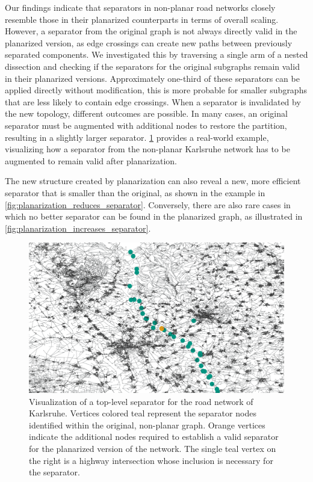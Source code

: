 Our findings indicate that separators in non-planar road networks closely resemble those in their planarized counterparts in terms of overall scaling.
However, a separator from the original graph is not always directly valid in the planarized version, as edge crossings can create new paths between previously separated components.
We investigated this by traversing a single arm of a nested dissection and checking if the separators for the original subgraphs remain valid in their planarized versions.
Approximately one-third of these separators can be applied directly without modification, this is more probable for smaller subgraphs that are less likely to contain edge crossings.
When a separator is invalidated by the new topology, different outcomes are possible.
In many cases, an original separator must be augmented with additional nodes to restore the partition, resulting in a slightly larger separator.
\cref{fig:karlsruhe_planar_vs_non_planar} provides a real-world example, visualizing how a separator from the non-planar Karlsruhe network has to be augmented to remain valid after planarization.

The new structure created by planarization can also reveal a new, more efficient separator that is smaller than the original, as shown in the example in \cref{fig:planarization_reduces_separator}.
Conversely, there are also rare cases in which no better separator can be found in the planarized graph, as illustrated in \cref{fig:planarization_increases_separator}.

\begin{figure}[tbhp]
    \centering
    \includegraphics[width=0.6\linewidth]{graphics/karlsruhe_top_level_sep_extended_to_planar_wide.png}
    \caption{Visualization of a top-level separator for the road network of Karlsruhe. Vertices colored teal represent the separator nodes identified within the original, non-planar graph. Orange vertices indicate the additional nodes required to establish a valid separator for the planarized version of the network. The single teal vertex on the right is a highway intersection whose inclusion is necessary for the separator.}
    \label{fig:karlsruhe_planar_vs_non_planar}
\end{figure}

